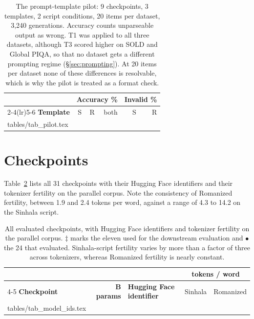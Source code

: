 \documentclass[11pt]{article}
\makeatletter
\newcommand{\rows}[1]{\@@input #1 }
\makeatother
\begin{document}
\begin{table}[t]
\centering\small
\setlength{\tabcolsep}{3.2pt}
\begin{tabular}{@{}lrrrrr@{}}
\toprule
& \multicolumn{3}{c}{\textbf{Accuracy \%}} & \multicolumn{2}{c}{\textbf{Invalid \%}} \\
\cmidrule(lr){2-4}\cmidrule(lr){5-6}
\textbf{Template} & S & R & both & S & R \\
\midrule
\rows{tables/tab_pilot.tex}
\bottomrule
\end{tabular}
\caption{The prompt-template pilot: 9 checkpoints, 3 templates, 2 script
conditions, 20 items per dataset, 3{,}240 generations. Accuracy counts
unparseable output as wrong. T1 was applied to all three datasets, although T3
scored higher on SOLD and Global PIQA, so that no dataset gets a different
prompting regime (\S\ref{sec:prompting}). At 20 items per dataset none of these
differences is resolvable, which is why the pilot is treated as a format check.}
\label{tab:pilot}
\end{table}

\section{Checkpoints}
\label{sec:models}

Table~\ref{tab:modelids} lists all 31 checkpoints with their Hugging Face
identifiers and their tokenizer fertility on the parallel corpus. Note the
consistency of Romanized fertility, between 1.9 and 2.4 tokens per word, against
a range of 4.3 to 14.2 on the Sinhala script.

\begin{table}[t]
\centering\small
\setlength{\tabcolsep}{5pt}
\begin{tabular}{@{}lrlrr@{}}
\toprule
& & & \multicolumn{2}{c}{\textbf{tokens / word}} \\
\cmidrule(lr){4-5}
\textbf{Checkpoint} & \textbf{B params} & \textbf{Hugging Face identifier}
& Sinhala & Romanized \\
\midrule
\rows{tables/tab_model_ids.tex}
\bottomrule
\end{tabular}
\caption{All evaluated checkpoints, with Hugging Face identifiers and tokenizer
fertility on the parallel corpus. $\ddagger$ marks the eleven used for the
downstream evaluation and $\bullet$ the 24 that
\citet{rajapakse-weerasinghe-2026-script} evaluated. Sinhala-script fertility
varies by more than a factor of three across tokenizers, whereas Romanized
fertility is nearly constant.}
\label{tab:modelids}
\end{table}
\end{document}
